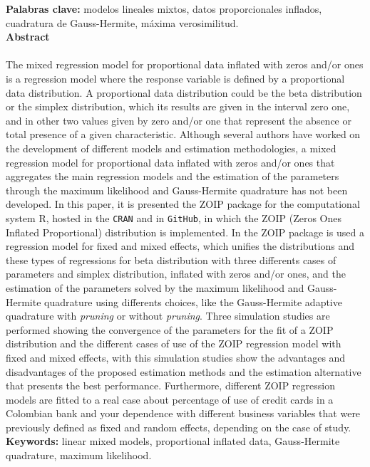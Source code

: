 \textbf{\small Palabras clave:} modelos lineales mixtos, datos proporcionales inflados, cuadratura de Gauss-Hermite, m\'{a}xima verosimilitud.\\


\textbf{\LARGE Abstract}\\\\
The mixed regression model for proportional data inflated with zeros and/or ones is a regression model where the response variable is defined by a proportional data distribution. A proportional data distribution could be the beta distribution or the simplex distribution, which its results are given in the interval zero one, and in other two values given by zero and/or one that represent the absence or total presence of a given characteristic. Although several authors have worked on the development of different models and estimation me\-tho\-do\-lo\-gies, a mixed regression model for proportional data inflated with zeros and/or ones that aggregates the main regression models and the estimation of the parameters through the maximum likelihood and Gauss-Hermite quadrature has not been developed. In this paper, it is presented the ZOIP package for the computational system R, hosted in the \verb|CRAN| and in \verb|GitHub|, in which the ZOIP (Zeros Ones Inflated Proportional) distribution is implemented. In the ZOIP package is used a regression model for fixed and mixed effects, which unifies the distributions and these types of regressions for beta distribution with three differents cases of parameters and simplex distribution, inflated with zeros and/or ones, and the estimation of the parameters solved by the maximum likelihood and Gauss-Hermite quadrature using differents choices, like the Gauss-Hermite adaptive quadrature with \textit{pruning} or without \textit{pruning}. Three simulation studies are performed showing the convergence of the parameters for the fit of a ZOIP distribution and the different cases of use of the ZOIP regression model with fixed and mixed effects, with this simulation studies show the advantages and disadvantages of the proposed estimation methods and the estimation alternative that presents the best performance. Furthermore, different ZOIP regression models are fitted to a real case about percentage of use of  credit cards in a Colombian bank and your dependence with different business variables that were previously defined as fixed and random effects, depending on the case of study.\\

\textbf{\small Keywords:} linear mixed models, proportional inflated data, Gauss-Hermite quadrature, maximum likelihood.\\